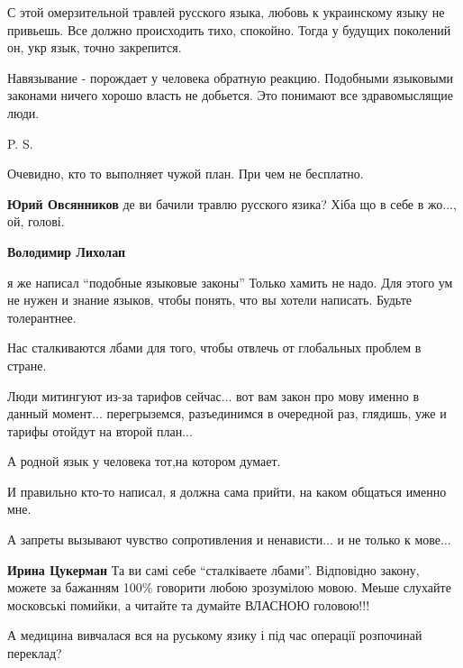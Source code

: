 \begin{itemize}
С этой омерзительной травлей русского языка, любовь к украинскому языку не
привьешь. Все должно происходить тихо, спокойно. Тогда у будущих поколений он,
укр язык, точно закрепится.

Навязывание - порождает у человека обратную реакцию. Подобными языковыми
законами ничего хорошо власть не добьется. Это понимают все здравомыслящие
люди.

P. S.

Очевидно, кто то выполняет чужой план. При чем не бесплатно.

\begin{itemize}
\textbf{Юрий Овсянников} де ви бачили травлю русского язика? Хіба що в себе в жо..., ой, голові.

\textbf{Володимир Лихолап} 

я же написал \enquote{подобные языковые законы} Только хамить не надо. Для
этого ум не нужен и знание языков, чтобы понять, что вы хотели написать. Будьте
толерантнее.
\end{itemize}


Нас сталкиваются лбами для того, чтобы отвлечь от глобальных проблем в стране.

Люди митингуют из-за тарифов сейчас... вот вам закон про мову именно в данный
момент... перегрыземся, разъединимся в очередной раз, глядишь, уже и тарифы
отойдут на второй план...

А родной язык у человека тот,на котором думает.

И правильно кто-то написал, я должна сама прийти, на каком общаться именно мне.

А запреты вызывают чувство сопротивления и ненависти... и не только к мове...

\begin{itemize}
\textbf{Ирина Цукерман} Та ви самі себе \enquote{сталківаете лбами}. Відповідно
закону, можете за бажанням 100\% говорити любою зрозумілою мовою. Меьше
слухайте московські помийки, а читайте та думайте ВЛАСНОЮ головою!!!

\end{itemize}

А медицина вивчалася вся на руському язику і під час операції розпочинай переклад?


\end{itemize}
